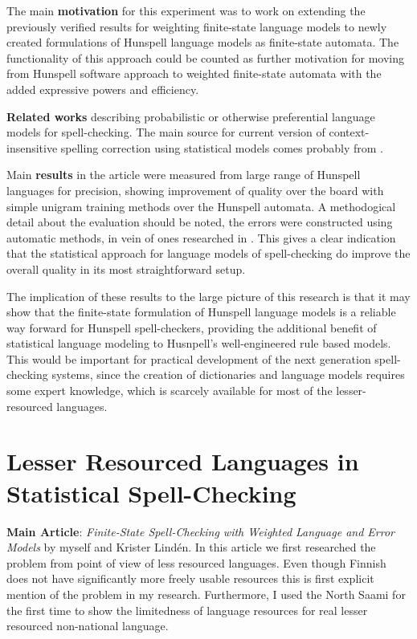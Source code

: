 \documentclass[officiallayout]{unihelcompling}
\begin{document}
The main \textbf{motivation} for this experiment was to work on extending the
previously verified results for weighting finite-state language models to newly
created formulations of Hunspell language models as finite-state automata. The
functionality of this approach could be counted as further motivation for
moving from Hunspell software approach to weighted finite-state automata with
the added expressive powers and efficiency.

\textbf{Related works} describing probabilistic or otherwise preferential
language models for spell-checking. The main source for current version of 
context-insensitive spelling correction using statistical models comes
probably from \citep{church1991probability}.

Main \textbf{results} in the article were measured from large range of Hunspell
languages for precision, showing improvement of quality over the board with
simple unigram training methods over the Hunspell automata. A methodogical
detail about the evaluation should be noted, the errors were constructed using
automatic methods, in vein of ones researched in
\citep{bigert2003autoeval,bigert2005automatic}. This gives a clear indication
that the statistical approach for language models of spell-checking do improve
the overall quality in its most straightforward setup.

The implication of these results to the large picture of this research is
that it may show that the finite-state formulation of Hunspell language models
is a reliable way forward for Hunspell spell-checkers, providing the additional
benefit of statistical language modeling to Husnpell's well-engineered
rule based models. This would be important for practical development of
the next generation spell-checking systems, since the creation of dictionaries
and language models requires some expert knowledge, which is scarcely available
for most of the lesser-resourced languages.

\section{Lesser Resourced Languages in Statistical Spell-Checking}
\label{sec:lesser-training}

\textbf{Main Article}: \emph{Finite-State Spell-Checking with Weighted Language
and Error Models} by myself and Krister Lindén. In this article we first
researched the problem from point of view of less resourced languages. Even
though Finnish does not have significantly more freely usable resources this
is first explicit mention of the problem in my research. Furthermore, I
used the North Saami for the first time to show the limitedness of language
resources for real lesser resourced non-national language.
\end{document}
